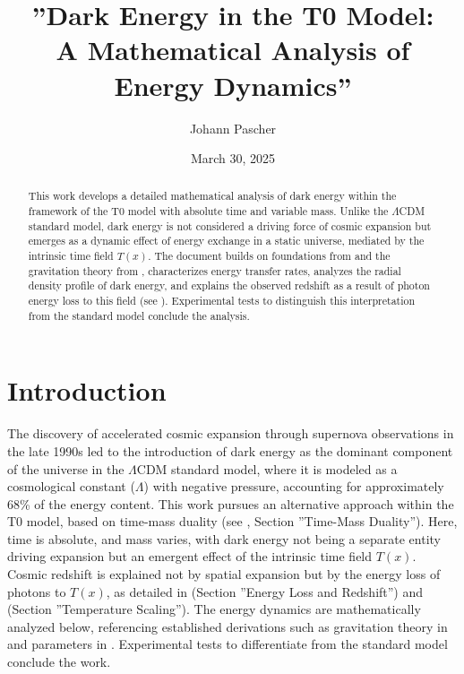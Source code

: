 \documentclass[a4paper,12pt]{article}
\theoremstyle{definition}
\theoremstyle{remark}
\newcommand{\Tfield}{T(x)}
\begin{document}
	
	\title{''Dark Energy in the T0 Model: \\A Mathematical Analysis of Energy Dynamics''}
	\author{Johann Pascher}
	\date{March 30, 2025}
	\maketitle
	
	\begin{abstract}
		This work develops a detailed mathematical analysis of dark energy within the framework of the T0 model with absolute time and variable mass. Unlike the \(\Lambda\)CDM standard model, dark energy is not considered a driving force of cosmic expansion but emerges as a dynamic effect of energy exchange in a static universe, mediated by the intrinsic time field \(\Tfield\). The document builds on foundations from \cite{pascher_params_2025} and the gravitation theory from \cite{pascher_galaxies_2025}, characterizes energy transfer rates, analyzes the radial density profile of dark energy, and explains the observed redshift as a result of photon energy loss to this field (see \cite{pascher_messdifferenzen_2025}). Experimental tests to distinguish this interpretation from the standard model conclude the analysis.
	\end{abstract}
	
	\tableofcontents
	\newpage
	
	\section{Introduction}
	
	The discovery of accelerated cosmic expansion through supernova observations in the late 1990s led to the introduction of dark energy as the dominant component of the universe in the \(\Lambda\)CDM standard model, where it is modeled as a cosmological constant (\(\Lambda\)) with negative pressure, accounting for approximately 68\% of the energy content. This work pursues an alternative approach within the T0 model, based on time-mass duality (see \cite{pascher_params_2025}, Section ''Time-Mass Duality''). Here, time is absolute, and mass varies, with dark energy not being a separate entity driving expansion but an emergent effect of the intrinsic time field \(\Tfield\). Cosmic redshift is explained not by spatial expansion but by the energy loss of photons to \(\Tfield\), as detailed in \cite{pascher_messdifferenzen_2025} (Section ''Energy Loss and Redshift'') and \cite{pascher_temp_2025} (Section ''Temperature Scaling''). The energy dynamics are mathematically analyzed below, referencing established derivations such as gravitation theory in \cite{pascher_galaxies_2025} and parameters in \cite{pascher_params_2025}. Experimental tests to differentiate from the standard model conclude the work.
	
\end{document}
